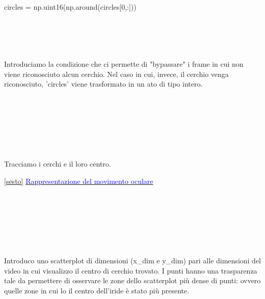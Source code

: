 \documentclass[12pt]{article}
\begin{document}
{{\begin{minipage}[c]{150mm}
\begin{center}
  			circles = np.uint16(np.around(circles[0,:]))\\	
  		\end{center}
  	\end{minipage}}
  	\\
  	\\
  	\\
  	\\
  	 Introduciamo la condizione che ci permette di "bypassare" i frame in cui non viene riconosciuto alcun cerchio. Nel caso in cui, invece, il cerchio venga riconosciuto, 'circles' viene trasformato in un ato di tipo intero.
  	\\
  	\\
  	\\
  	\\
  	\\
    \\
	\\
	\\
	Tracciamo i cerchi e il loro centro.
\pagebreak
  	 				
  	 				
  	 				
  	 				
\ref {sesto} \underline{\textcolor{blue}{Rappresentazione del movimento oculare}}
  	\\
  	\\
  	\\
  	\\
  	\\
  	\\
  	\\
    \\
  	Introduco uno scatterplot di dimensioni (x\_dim e y\_dim) pari alle dimensioni del video in cui visualizzo il centro di cerchio trovato. I punti hanno una trasparenza tale da permettere di osservare le zone dello scatterplot più dense di punti: ovvero quelle zone in cui lo il centro dell'iride è stato più presente.
\pagebreak


}
\end{document}
